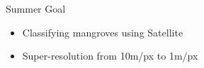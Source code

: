 





\begin{frame}{Summer Goal}
    \centering
    \begin{itemize}
        \item Classifying mangroves using Satellite
        \item Super-resolution from 10m/px to 1m/px
    \end{itemize}
\end{frame}

